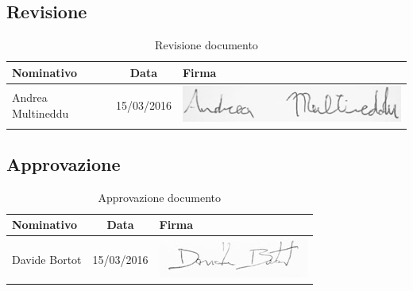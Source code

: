 \documentclass[a4paper,11pt]{article}
\begin{document}
	\subsection*{Revisione}
	\begin{table}[h!]
		\begin{tabularx}{\textwidth}{XcX}
			\textbf{Nominativo} & \textbf{Data} &\hspace{20 mm}  \textbf{Firma}\\
			\midrule
			Andrea Multineddu & 15/03/2016 & \hspace{20 mm} \includegraphics[scale=0.3]{../Firme/multi.jpg} \\
			\bottomrule
		\end{tabularx}
	\caption{Revisione documento}
	\end{table}
	
	\subsection*{Approvazione}
	\begin{table}[h!]
		\begin{tabularx}{\textwidth}{XcX}
			\textbf{Nominativo} & \textbf{Data} &\hspace{20 mm}  \textbf{Firma}\\
			\midrule
			Davide Bortot & 15/03/2016 & \hspace{20 mm} \includegraphics[scale=0.35]{../Firme/db.jpg} \\ 
			\bottomrule
		\end{tabularx}
	\caption{Approvazione documento}
	\end{table}
\end{document}
